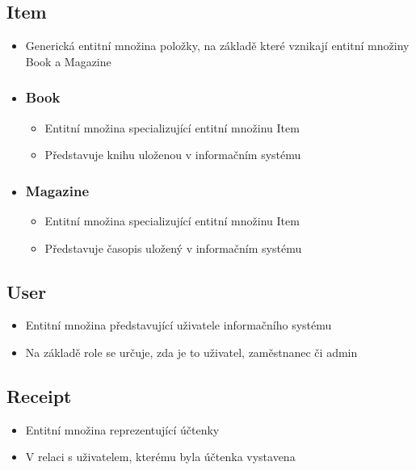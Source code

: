 \documentclass{article}
\begin{document}
\subsection*{Item}
\begin{itemize}
    \item Generická entitní množina položky, na základě které vznikají entitní
    množiny Book a Magazine

    \item \subsubsection*{Book}
    \begin{itemize}
        \item Entitní množina specializující entitní množinu Item
        \item Představuje knihu uloženou v informačním systému
    \end{itemize}

    \item \subsubsection*{Magazine}
    \begin{itemize}
        \item Entitní množina specializující entitní množinu Item
        \item Představuje časopis uložený v informačním systému
    \end{itemize}
\end{itemize}

\subsection*{User}
\begin{itemize}
    \item Entitní množina představující uživatele informačního systému
    \item Na základě role se určuje, zda je to uživatel, zaměstnanec či admin
\end{itemize}

\subsection*{Receipt}
\begin{itemize}
    \item Entitní množina reprezentující účtenky
    \item V relaci s uživatelem, kterému byla účtenka vystavena
\end{itemize}
\end{document}
